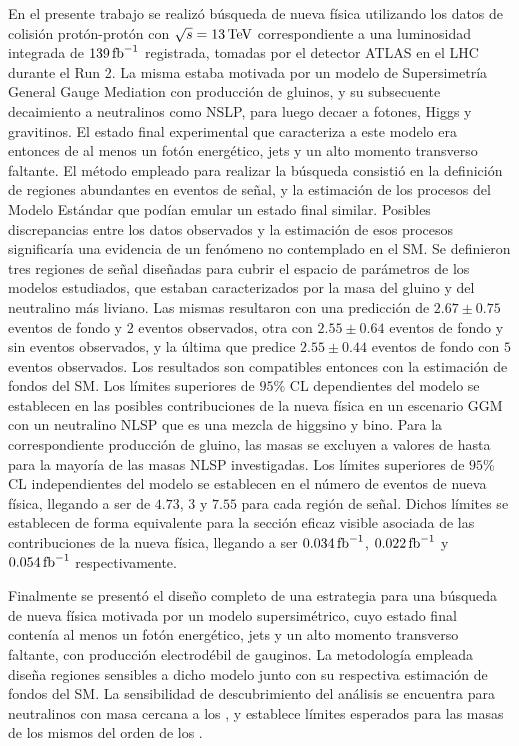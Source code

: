 En el presente trabajo se realizó búsqueda de nueva física utilizando los datos de colisión protón-protón con $\sqrt{s}=13\,\text{TeV}$ correspondiente a una luminosidad integrada de $139\,\text{fb}^{-1}$ registrada, tomadas por el detector ATLAS en el LHC durante el Run 2. La misma estaba motivada por un modelo de Supersimetría General Gauge Mediation con producción de gluinos, y su subsecuente decaimiento a neutralinos como NSLP, para luego decaer a fotones, Higgs y gravitinos. El estado final experimental que caracteriza a este modelo era entonces de al menos un fotón energético, jets y un alto momento transverso faltante. El método empleado para realizar la búsqueda consistió en la definición de regiones abundantes en eventos de señal, y la estimación de los procesos del Modelo Estándar que podían emular un estado final similar. Posibles discrepancias entre los datos observados y la estimación de esos procesos significaría una evidencia de un fenómeno no contemplado en el SM. 
Se definieron tres regiones de señal diseñadas para cubrir el espacio de parámetros de los modelos estudiados, que estaban caracterizados por la masa del gluino y del neutralino más liviano. Las mismas resultaron con una predicción de $2.67 \pm 0.75$ eventos de fondo y $2$ eventos observados, otra con $2.55 \pm 0.64$ eventos de fondo y sin eventos observados, y la última que predice $2.55 \pm 0.44$ eventos de fondo con $5$ eventos observados.
Los resultados son compatibles entonces con la estimación de fondos del SM. Los límites superiores de $95\%$ CL dependientes del modelo se establecen en las posibles contribuciones de la nueva física en un escenario GGM con un neutralino NLSP que es una mezcla de higgsino y bino. Para la correspondiente producción de gluino, las masas se excluyen a valores de hasta  para la mayoría de las masas NLSP investigadas. Los límites superiores de $95\%$ CL independientes del modelo se establecen en el número de eventos de nueva física, llegando a ser de $4.73$, $3$ y $7.55$ para cada región de señal. Dichos límites se establecen de forma equivalente para la sección eficaz visible asociada de las contribuciones de la nueva física, llegando a ser $0.034\,\text{fb}^{-1}$, $0.022\,\text{fb}^{-1}$ y $0.054\,\text{fb}^{-1}$ respectivamente. 

Finalmente se presentó el diseño completo de una estrategia para una búsqueda de nueva física motivada por un modelo supersimétrico, cuyo estado final contenía al menos un fotón energético, jets y un alto momento transverso faltante, con producción electrodébil de gauginos. La metodología empleada diseña regiones sensibles a dicho modelo junto con su respectiva estimación de fondos del SM. La sensibilidad de descubrimiento del análisis se encuentra para neutralinos con masa cercana a los , y establece límites esperados para las masas de los mismos del orden de los .